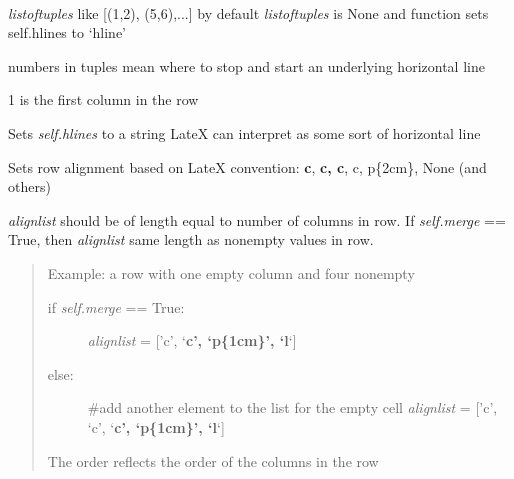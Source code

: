\documentclass[letterpaper,10pt,english]{sphinxmanual}
\begin{document}
\begin{fulllineitems}
\label{summary:tablemaker.Row}~

\begin{fulllineitems}
\label{summary:tablemaker.Row.addhlines}
\emph{listoftuples} like {[}(1,2), (5,6),...{]}
by default \emph{listoftuples} is None and function
sets self.hlines to `hline'

numbers in tuples mean where to stop and
start an underlying horizontal line

1 is the first column in the row

Sets \emph{self.hlines} to a string LateX can
interpret as some sort of horizontal line

\end{fulllineitems}


\begin{fulllineitems}
\label{summary:tablemaker.Row.align}
Sets row alignment based on LateX convention:
{\color{red}\bfseries{}\textbar{}c\textbar{}}, {\color{red}\bfseries{}\textbar{}c, c\textbar{}}, c, p\{2cm\}, None (and others)

\emph{alignlist} should be of length equal to number of
columns in row. If \emph{self.merge} == True, then \emph{alignlist}
same length as nonempty values in row.
\begin{quote}

Example: a row with one empty column and four nonempty
\begin{description}
\item[{if \emph{self.merge} == True:}] \leavevmode
\emph{alignlist} = {[}'c', `{\color{red}\bfseries{}\textbar{}c', `p\{1cm\}', `\textbar{}l\textbar{}}`{]}

\item[{else:}] \leavevmode
\#add another element to the list for the empty cell
\emph{alignlist} = {[}'c', `c', `{\color{red}\bfseries{}\textbar{}c', `p\{1cm\}', `\textbar{}l\textbar{}}`{]}

\end{description}

The order reflects the order of the columns in the row
\end{quote}


\end{fulllineitems}
\end{fulllineitems}
\end{document}

